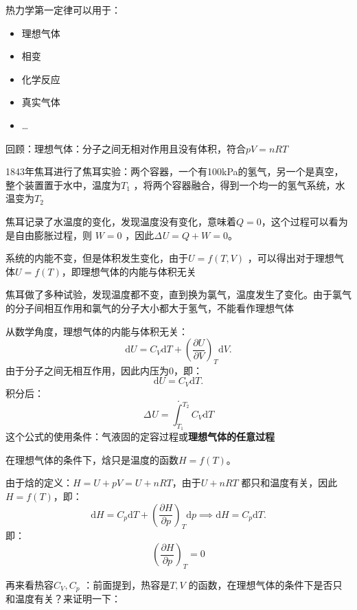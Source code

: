 热力学第一定律可以用于：
\begin{itemize}
    \item 理想气体
    \item 相变
    \item 化学反应
    \item 真实气体
    \item \ldots 
\end{itemize}
回顾：理想气体：分子之间无相对作用且没有体积，符合$pV=nRT $ 
\begin{notation}
    1843年焦耳进行了焦耳实验：两个容器，一个有100kPa的氢气，另一个是真空，整个装置置于水中，温度为$T_1$ ，将两个容器融合，得到一个均一的氢气系统，水温变为$T_2$ 

    焦耳记录了水温度的变化，发现温度没有变化，意味着$Q=0$，这个过程可以看为是自由膨胀过程，则 $W=0$ ，因此$\Delta_\text{}U = Q+W=0 $。

    系统的内能不变，但是体积发生变化，由于$U=f\left( T,V \right)$ ，可以得出对于理想气体$U= f\left( T \right) $，即理想气体的内能与体积无关

    焦耳做了多种试验，发现温度都不变，直到换为氯气，温度发生了变化。由于氯气的分子间相互作用和氯气的分子大小都大于氢气，不能看作理想气体
\end{notation}
从数学角度，理想气体的内能与体积无关：\[
    \mathrm{d}U = C_{V}\mathrm{d}T + \left(\frac{\partial U}{\partial V}\right)_{T}\mathrm{d}V
.\]
由于分子之间无相互作用，因此内压为0，即：\[\boxed{
    \mathrm{d}U = C_{V}\mathrm{d}T
.}\]
积分后：\[
.\]
\begin{equation}
    \label{eq:使用恒容热容计算内能变}
    \Delta_\text{}U = \int_{T_1}^{T_2} C_{V} \mathrm{d}T 
\end{equation}
这个公式的使用条件：气液固的定容过程或\textbf{理想气体的任意过程}

在理想气体的条件下，焓只是温度的函数$H=f\left( T \right)$。

由于焓的定义：$H=U+pV=U+nRT $，由于$U+nRT $ 都只和温度有关，因此$H=f\left( T \right)$，即：\[
    \mathrm{d}H = C_{p}\mathrm{d}T + \left(\frac{\partial H}{\partial p}\right)_{T}\mathrm{d}p \implies \mathrm{d}H = C_{p}\mathrm{d}T
.\]
即：
\begin{equation}
    \label{eq:h/p_t=0}
    \left(\frac{\partial H}{\partial p}\right)_{T}=0
\end{equation}

再来看热容$C_{V},C_{p}$ ：前面提到，热容是$T,V$ 的函数，在理想气体的条件下是否只和温度有关？来证明一下：

